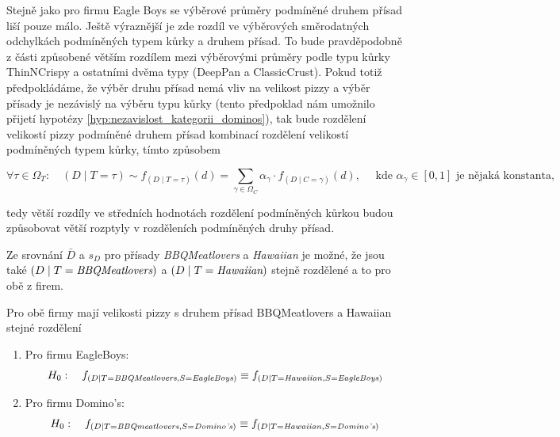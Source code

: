 \begin{table}[H]
	\caption{Základní statistiky velikosti pizz podmíněné přísadou pro firmu Domino's}
\end{table}

Stejně jako pro firmu Eagle Boys se výběrové průměry podmíněné druhem přísad liší pouze
málo. Ještě výraznější je zde rozdíl ve výběrových směrodatných odchylkách podmíněných typem kůrky a druhem
přísad. To bude pravděpodobně z části způsobené větším rozdílem mezi výběrovými průměry podle
typu kůrky ThinNCrispy a ostatními dvěma typy (DeepPan a ClassicCrust). Pokud
totiž předpokládáme, že výběr druhu přísad nemá vliv na velikost pizzy a výběr přísady je nezávislý na
výběru typu kůrky (tento předpoklad nám umožnilo přijetí hypotézy \ref{hyp:nezavislost_kategorii_dominos}), tak bude rozdělení velikostí pizzy podmíněné druhem přísad  kombinací rozdělení
velikostí podmíněných typem kůrky, tímto způsobem

\[
	\forall \tau \in \Omega_T: \quad  \left( D \mid T = \tau \right) \sim f_{\left(  D \mid T = \tau \right)}(d) = \sum_{\gamma \in \Omega_C} \alpha_{\gamma} \cdot f_{\left(  D \mid C
			= \gamma \right)}(d), \quad \text{ kde } \alpha_{\gamma} \in [0,1] \text{ je nějaká konstanta},
\]

\noindent tedy větší rozdíly ve středních hodnotách rozdělení podmíněných kůrkou budou způsobovat větší rozptyly v rozděleních podmíněných druhy přísad.

Ze srovnání \(\bar{D}\) a \(s_{D}\) pro přísady \emph{BBQMeatlovers} a \emph{Hawaiian}
je možné, že jsou také \( \left( D \mid T = \emph{BBQMeatlovers} \right)\) a \linebreak \(\left( D \mid T = \emph{Hawaiian} \right)\) stejně
rozdělené a to pro obě z firem.

\begin{hypothesis}
	\label{hyp:stejne_rozdeleni_bbq_a_haw}
	Pro obě firmy mají velikosti pizzy s druhem přísad BBQMeatlovers a Hawaiian
	stejné rozdělení
	\begin{enumerate}[label = (\alph*)]
		\item Pro firmu EagleBoys:
		      \label{hyp:stejne_rozdeleni_bbq_a_haw_eb}
		      \[
			      H_0: \quad f_{\left( D \mid T = \text{\emph{BBQMeatlovers}}, S =
					      \text{\emph{EagleBoys}} \right)} \equiv f_{\left( D
					      \mid T = \text{\emph{Hawaiian}}, S = \text{\emph{EagleBoys}} \right)}
		      \]
		\item Pro firmu Domino's:
		      \label{hyp:stejne_rozdeleni_bbq_a_haw_d}
		      \[
			      H_0: \quad f_{\left( D \mid T = \text{\emph{BBQmeatlovers}}, S =
					      \text{\emph{Domino's}} \right)} \equiv f_{\left( D \mid T = \text{\emph{Hawaiian}}, S =
					      \text{\emph{Domino's}} \right)}
		      \]
	\end{enumerate}
\end{hypothesis}

